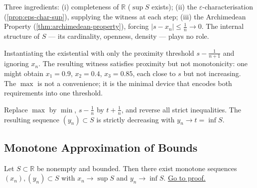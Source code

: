 \begin{remark}
Three ingredients: (i) completeness of $\mathbb{R}$ ($\sup S$ exists);
(ii) the $\varepsilon$-characterisation (\cref{prop:eps-char-sup}), supplying
the witness at each step; (iii) the Archimedean Property
(\cref{thm:archimedean-property}), forcing $|s-x_n|\leq\tfrac{1}{n}\to 0$.
The internal structure of $S$ --- its cardinality, openness, density ---
plays no role.
\end{remark}

\begin{remark}
Instantiating the existential with only the proximity threshold
$s-\tfrac{1}{n+1}$ and ignoring $x_n$. The resulting witness satisfies
proximity but not monotonicity: one might obtain $x_1=0.9$, $x_2=0.4$,
$x_3=0.85$, each close to $s$ but not increasing. The $\max$ is not a
convenience; it is the minimal device that encodes both requirements into
one threshold.
\end{remark}

\begin{remark}
Replace $\max$ by $\min$, $s-\tfrac{1}{n}$ by $t+\tfrac{1}{n}$, and
reverse all strict inequalities. The resulting sequence $(y_n)\subset S$
is strictly decreasing with $y_n\to t=\inf S$.
\end{remark}

\subsection*{Monotone Approximation of Bounds}
\label{subsec:monotone-approx}

\begin{proposition}
\label{prop:monotone-approx-bounds}
Let $S\subset\mathbb{R}$ be nonempty and bounded. Then there exist
monotone sequences $(x_n),(y_n)\subset S$ with
$x_n\to\sup S$ and $y_n\to\inf S$.
\hyperref[prf:monotone-approx-bounds]{Go to proof.}
\end{proposition}

\begin{remark*}
\end{remark*}


